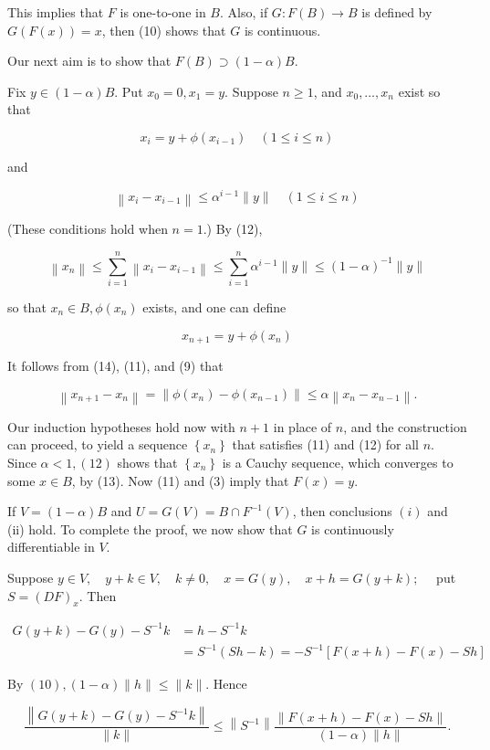 \documentclass[10pt]{article}
\begin{document}
This implies that $F$ is one-to-one in $B$. Also, if $G: F(B) \rightarrow B$ is defined by $G(F(x))=x$, then (10) shows that $G$ is continuous.

Our next aim is to show that $F(B) \supset(1-\alpha) B$.

Fix $y \in(1-\alpha) B$. Put $x_{0}=0, x_{1}=y$. Suppose $n \geq 1$, and $x_{0}, \ldots, x_{n}$ exist so that

$$
x_{i}=y+\phi\left(x_{i-1}\right) \quad(1 \leq i \leq n)
$$

and

$$
\left\|x_{i}-x_{i-1}\right\| \leq \alpha^{i-1}\|y\| \quad(1 \leq i \leq n)
$$

(These conditions hold when $n=1$.) By (12),

$$
\left\|x_{n}\right\| \leq \sum_{i=1}^{n}\left\|x_{i}-x_{i-1}\right\| \leq \sum_{i=1}^{n} \alpha^{i-1}\|y\| \leq(1-\alpha)^{-1}\|y\|
$$

so that $x_{n} \in B, \phi\left(x_{n}\right)$ exists, and one can define

$$
x_{n+1}=y+\phi\left(x_{n}\right)
$$

It follows from (14), (11), and (9) that

$$
\left\|x_{n+1}-x_{n}\right\|=\left\|\phi\left(x_{n}\right)-\phi\left(x_{n-1}\right)\right\| \leq \alpha\left\|x_{n}-x_{n-1}\right\| .
$$

Our induction hypotheses hold now with $n+1$ in place of $n$, and the construction can proceed, to yield a sequence $\left\{x_{n}\right\}$ that satisfies (11) and (12) for all $n$. Since $\alpha<1,(12)$ shows that $\left\{x_{n}\right\}$ is a Cauchy sequence, which converges to some $x \in B$, by (13). Now (11) and (3) imply that $F(x)=y$.

If $V=(1-\alpha) B$ and $U=G(V)=B \cap F^{-1}(V)$, then conclusions $(i)$ and (ii) hold. To complete the proof, we now show that $G$ is continuously differentiable in $V$.

Suppose $y \in V, \quad y+k \in V, \quad k \neq 0, \quad x=G(y), \quad x+h=G(y+k) ; \quad$ put $S=(D F)_{x}$. Then

$$
\begin{aligned}
G(y+k)-G(y)-S^{-1} k & =h-S^{-1} k \\
& =S^{-1}(S h-k)=-S^{-1}[F(x+h)-F(x)-S h]
\end{aligned}
$$

By $(10),(1-\alpha)\|h\| \leq\|k\|$. Hence

$$
\frac{\left\|G(y+k)-G(y)-S^{-1} k\right\|}{\|k\|} \leq\left\|S^{-1}\right\| \frac{\|F(x+h)-F(x)-S h\|}{(1-\alpha)\|h\|} .
$$
\end{document}
